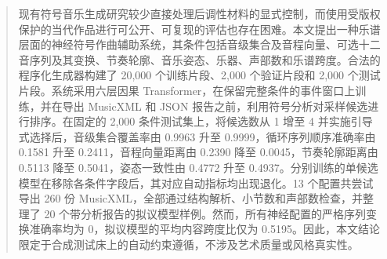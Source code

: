 \begin{abstract}
现有符号音乐生成研究较少直接处理后调性材料的显式控制，而使用受版权保护的当代作品进行可公开、可复现的评估也存在困难。本文提出一种乐谱层面的神经符号作曲辅助系统，其条件包括音级集合及音程向量、可选十二音序列及其变换、节奏轮廓、音乐姿态、乐器、声部数和乐谱跨度。合法的程序化生成器构建了 20,000 个训练片段、2,000 个验证片段和 2,000 个测试片段。系统采用六层因果 Transformer，在保留完整条件的事件窗口上训练，并在导出 MusicXML 和 JSON 报告之前，利用符号分析对采样候选进行排序。在固定的 2,000 条件测试集上，将候选数从 1 增至 4 并实施引导式选择后，音级集合覆盖率由 0.9963 升至 0.9999，循环序列顺序准确率由 0.1581 升至 0.2411，音程向量距离由 0.2390 降至 0.0045，节奏轮廓距离由 0.5113 降至 0.5041，姿态一致性由 0.4772 升至 0.4937。分别训练的单候选模型在移除各条件字段后，其对应自动指标均出现退化。13 个配置共尝试导出 260 份 MusicXML，全部通过结构解析、小节数和声部数检查，并整理了 20 个带分析报告的拟议模型样例。然而，所有神经配置的严格序列变换准确率均为 0，拟议模型的平均内容跨度比仅为 0.5195。因此，本文结论限定于合成测试床上的自动约束遵循，不涉及艺术质量或风格真实性。
\end{abstract}
